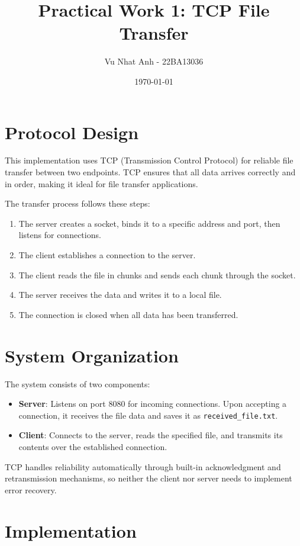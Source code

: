 \documentclass{article}
\title{Practical Work 1: TCP File Transfer}
\author{Vu Nhat Anh - 22BA13036}
\date{\today}
\begin{document}
\maketitle

\section{Protocol Design}
This implementation uses TCP (Transmission Control Protocol) for reliable file transfer between two endpoints. TCP ensures that all data arrives correctly and in order, making it ideal for file transfer applications.

The transfer process follows these steps:
\begin{enumerate}
    \item The server creates a socket, binds it to a specific address and port, then listens for connections.
    \item The client establishes a connection to the server.
    \item The client reads the file in chunks and sends each chunk through the socket.
    \item The server receives the data and writes it to a local file.
    \item The connection is closed when all data has been transferred.
\end{enumerate}

\section{System Organization}
The system consists of two components:
\begin{itemize}
    \item \textbf{Server}: Listens on port 8080 for incoming connections. Upon accepting a connection, it receives the file data and saves it as \texttt{received\_file.txt}.
    \item \textbf{Client}: Connects to the server, reads the specified file, and transmits its contents over the established connection.
\end{itemize}

TCP handles reliability automatically through built-in acknowledgment and retransmission mechanisms, so neither the client nor server needs to implement error recovery.

\section{Implementation}
\end{document}
